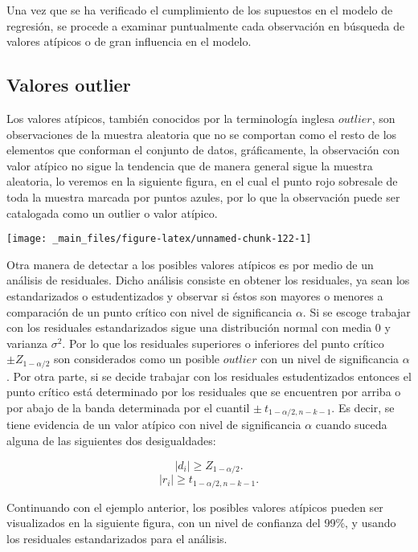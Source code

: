 \documentclass[
  a4paper,
  oneside,
  openany]{book}
\begin{document}
Una vez que se ha verificado el cumplimiento de los supuestos en el modelo de regresión, se procede a examinar puntualmente cada observación en búsqueda de valores atípicos o de gran influencia en el modelo.

\hypertarget{valores-outlier}{%
\subsection{Valores outlier}\label{valores-outlier}}

Los valores atípicos, también conocidos por la terminología inglesa \(outlier\), son observaciones de la muestra aleatoria que no se comportan como el resto de los elementos que conforman el conjunto de datos, gráficamente, la observación con valor atípico no sigue la tendencia que de manera general sigue la muestra aleatoria, lo veremos en la siguiente figura, en el cual el punto rojo sobresale de toda la muestra marcada por puntos azules, por lo que la observación puede ser catalogada como un outlier o valor atípico.

\begin{center}\texttt{[image: \_main\_files/figure-latex/unnamed-chunk-122-1]} \end{center}

Otra manera de detectar a los posibles valores atípicos es por medio de un análisis de residuales. Dicho análisis consiste en obtener los residuales, ya sean los estandarizados o estudentizados y observar si éstos son mayores o menores a comparación de un punto crítico con nivel de significancia \(\alpha\). Si se escoge trabajar con los residuales estandarizados sigue una distribución normal con media 0 y varianza \(\sigma^2\). Por lo que los residuales superiores o inferiores del punto crítico \(\pm Z_{1-\alpha/2}\) son considerados como un posible \(outlier\) con un nivel de significancia \(\alpha\). Por otra parte, si se decide trabajar con los residuales estudentizados entonces el punto crítico está determinado por los residuales que se encuentren por arriba o por abajo de la banda determinada por el cuantil \(\pm \ t_{1-\alpha/2,n-k-1}.\) Es decir, se tiene evidencia de un valor atípico con nivel de significancia \(\alpha\) cuando suceda alguna de las siguientes dos desigualdades:

\[\mid d_{i} \mid \geq Z_{1-\alpha/2}.\]
\[\mid r_{i}\mid  \geq t_{1-\alpha/2,n-k-1}.\]

Continuando con el ejemplo anterior, los posibles valores atípicos pueden ser visualizados en la siguiente figura, con un nivel de confianza del 99\%, y usando los residuales estandarizados para el análisis.
\end{document}
